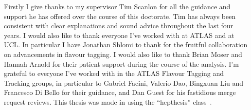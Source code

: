Firstly I give thanks to my supervisor Tim Scanlon for all the guidance and support he has offered over the course of this doctorate.
Tim has always been consistent with clear explanations and sound advice throughout the last four years.
I would also like to thank everyone I've worked with at ATLAS and at UCL.
In particular I have Jonathan Shlomi to thank for the fruitful collaboration on advancements in flavour tagging.
I would also like to thank Brian Moser and Hannah Arnold for their patient support during the course of the \VHbb analysis.
I'm grateful to everyone I've worked with in the ATLAS Flavour Tagging and Tracking groups, in particular to Gabriel Facini, Valerio Dao, Bingxuan Liu and Francesco Di Bello for their guidance, and Dan Guest for his fastidious merge request reviews.
This thesis was made in \LaTeXe{} using the ``hepthesis'' class~\cite{Buckley:2010:hepthesis}.


